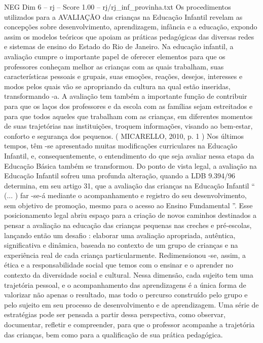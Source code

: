 \begin{textsample}{NEG Dim 6 – rj – Score 1.00 – rj/rj\_inf\_provinha.txt}  \label{ex:f6_neg_008}
Os procedimentos utilizados para a AVALIAÇÃO das crianças na Educação Infantil revelam as concepções sobre desenvolvimento, aprendizagem, infância e a educação, expondo assim os modelos teóricos que apoiam as práticas pedagógicas das diversas redes e sistemas de ensino do Estado do Rio de Janeiro.
Na educação infantil, a avaliação cumpre o importante papel de oferecer elementos para que os professores conheçam melhor as crianças com as quais trabalham, suas características pessoais e grupais, suas emoções, reações, desejos, interesses e modos pelos quais vão se apropriando da cultura na qual estão inseridas, transformando -a.
A avaliação tem também a importante função de contribuir para que os laços dos professores e da escola com as famílias sejam estreitados e para que todos aqueles que trabalham com as crianças, em diferentes momentos de suas trajetórias nas instituições, troquem informações, visando ao bem-estar, conforto e segurança dos pequenos. ( MICARELLO, 2010, p. 1 ) Nos últimos tempos, têm -se apresentado muitas modificações curriculares na Educação Infantil, e, consequentemente, o entendimento do que seja avaliar nessa etapa da Educação Básica também se transformou.
Do ponto de vista legal, a avaliação na Educação Infantil sofreu uma profunda alteração, quando a LDB 9.394/96 determina, em seu artigo 31, que a avaliação das crianças na Educação Infantil “ (... ) far -se-á mediante o acompanhamento e registro do seu desenvolvimento, sem objetivo de promoção, mesmo para o acesso ao Ensino Fundamental ”.
Esse posicionamento legal abriu espaço para a criação de novos caminhos destinados a pensar a avaliação na educação das crianças pequenas nas creches e pré-escolas, lançando então um desafio : elaborar uma avaliação apropriada, autêntica, significativa e dinâmica, baseada no contexto de um grupo de crianças e na experiência real de cada criança particularmente.
Redimensionou -se, assim, a ética e a responsabilidade social que temos com o ensinar e o aprender no contexto da diversidade social e cultural.
Nessa dimensão, cada sujeito tem uma trajetória pessoal, e o acompanhamento das aprendizagens é a única forma de valorizar não apenas o resultado, mas todo o percurso construído pelo grupo e pelo sujeito em seu processo de desenvolvimento e de aprendizagem.
Uma série de estratégias pode ser pensada a partir dessa perspectiva, como observar, documentar, refletir e compreender, para que o professor acompanhe a trajetória das crianças, bem como para a qualificação de sua prática pedagógica.

\end{textsample}
